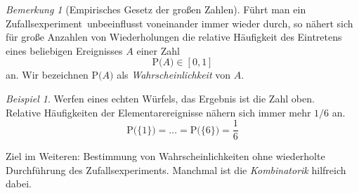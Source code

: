 \documentclass[a4paper,12pt,fleqn]{scrartcl}
\newcommand{\prob}[1]{\text{P(} #1 \text{)}}
\newcommand{\ZE}{Zufallsexperiment}
\newcommand{\unit}{\left[ 0,1\right]}
\theoremstyle{definition}
\theoremstyle{plain}
\theoremstyle{remark}
\newtheorem*{bemerkung}{Bemerkung}
\newtheorem{beispiel}[definition]{Beispiel}
\begin{document}
\begin{bemerkung}[Empirisches Gesetz der großen Zahlen]
Führt man ein \ZE \, unbeeinflusst voneinander immer wieder durch, so nähert sich für große Anzahlen von Wiederholungen die relative Häufigkeit des Eintretens eines beliebigen Ereignisses $A$ einer Zahl
\[\prob{A} \in\unit\]
an. Wir bezeichnen $\prob{A}$ als \emph{Wahrscheinlichkeit} von $A$.
\end{bemerkung}
\begin{beispiel}
Werfen eines echten Würfels, das Ergebnis ist die Zahl oben.\\
Relative Häufigkeiten der Elementarereignisse nähern sich immer mehr $1/6$ an.
\[\prob{\{ 1\}}=\ldots=\prob{\{ 6\} }=\frac{1}{6}\]
\end{beispiel}
Ziel im Weiteren: Bestimmung von Wahrscheinlichkeiten ohne wiederholte Durchführung des \ZE s. Manchmal ist die \emph{Kombinatorik} hilfreich dabei.
\end{document}
